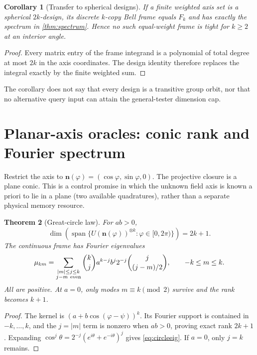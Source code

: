\documentclass[11pt]{article}
\newtheorem{theorem}{Theorem}[section]
\newtheorem{corollary}[theorem]{Corollary}
\theoremstyle{definition}
\theoremstyle{remark}
\newcommand{\Span}{\operatorname{span}}
\begin{document}
\begin{corollary}[Transfer to spherical designs]\label{cor:design}
If a finite weighted axis set is a spherical $2k$-design, its discrete
$k$-copy Bell frame equals $F_k$ and has exactly the spectrum in
\cref{thm:spectrum}.  Hence no such equal-weight frame is tight for
$k\geq2$ at an interior angle.
\end{corollary}

\begin{proof}
Every matrix entry of the frame integrand is a polynomial of total degree at
most $2k$ in the axis coordinates.  The design identity therefore replaces
the integral exactly by the finite weighted sum.
\end{proof}

The corollary does not say that every design is a transitive group orbit, nor
that no alternative query input can attain the general-tester dimension cap.

\section{Planar-axis oracles: conic rank and Fourier spectrum}

Restrict the axis to
$\bm n(\varphi)=(\cos\varphi,\sin\varphi,0)$.  The projective closure is a
plane conic.  This is a control promise in which the unknown field axis is
known a priori to lie in a plane (two available quadratures), rather than a
separate physical memory resource.

\begin{theorem}[Great-circle law]\label{thm:circle}
For $ab>0$,
\begin{equation}
 \dim\!\left(\Span\{U(\bm n(\varphi))^{\otimes k}:\varphi\in[0,2\pi)\}\right)=2k+1.
\end{equation}
The continuous frame has Fourier eigenvalues
\begin{equation}\label{eq:circleeig}
 \mu_{km}=
 \sum_{\substack{|m|\leq j\leq k\\j-m\ {\rm even}}}
 \binom{k}{j}a^{k-j}b^j2^{-j}
 \binom{j}{(j-m)/2},
 \qquad -k\leq m\leq k.
\end{equation}
All are positive.  At $a=0$, only modes $m\equiv k\pmod2$ survive and the
rank becomes $k+1$.
\end{theorem}

\begin{proof}
The kernel is $(a+b\cos(\varphi-\psi))^k$.  Its Fourier support is contained
in $-k,\ldots,k$, and the $j=|m|$ term is nonzero when $ab>0$, proving exact
rank $2k+1$.  Expanding $\cos^j\theta=2^{-j}(e^{i\theta}+e^{-i\theta})^j$
gives \cref{eq:circleeig}.  If $a=0$, only $j=k$ remains.
\end{proof}
\end{document}
